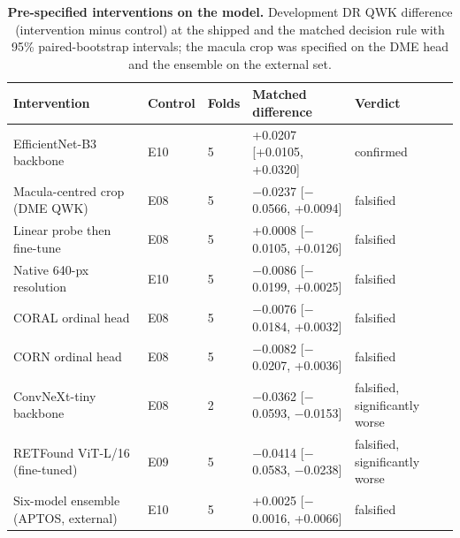 \begin{table}[h]
\caption{\textbf{Pre-specified interventions on the model.} Development DR QWK
difference (intervention minus control) at the shipped and the matched decision rule with 95\%
paired-bootstrap intervals; the macula crop was specified on the DME head and the
ensemble on the external set.}\label{tab:interv}
\centering\scriptsize\setlength{\tabcolsep}{3pt}
\begin{tabular}{@{}lllll@{}}
\toprule
Intervention & Control & Folds & Matched difference & Verdict \\
\midrule
EfficientNet-B3 backbone & E10 & 5 & +0.0207 [+0.0105, +0.0320] & confirmed \\
Macula-centred crop (DME QWK) & E08 & 5 & $-$0.0237 [$-$0.0566, +0.0094] & falsified \\
Linear probe then fine-tune & E08 & 5 & +0.0008 [$-$0.0105, +0.0126] & falsified \\
Native 640-px resolution & E10 & 5 & $-$0.0086 [$-$0.0199, +0.0025] & falsified \\
CORAL ordinal head & E08 & 5 & $-$0.0076 [$-$0.0184, +0.0032] & falsified \\
CORN ordinal head & E08 & 5 & $-$0.0082 [$-$0.0207, +0.0036] & falsified \\
ConvNeXt-tiny backbone & E08 & 2 & $-$0.0362 [$-$0.0593, $-$0.0153] & falsified, significantly worse \\
RETFound ViT-L/16 (fine-tuned) & E09 & 5 & $-$0.0414 [$-$0.0583, $-$0.0238] & falsified, significantly worse \\
Six-model ensemble (APTOS, external) & E10 & 5 & +0.0025 [$-$0.0016, +0.0066] & falsified \\
\bottomrule
\end{tabular}
\end{table}
